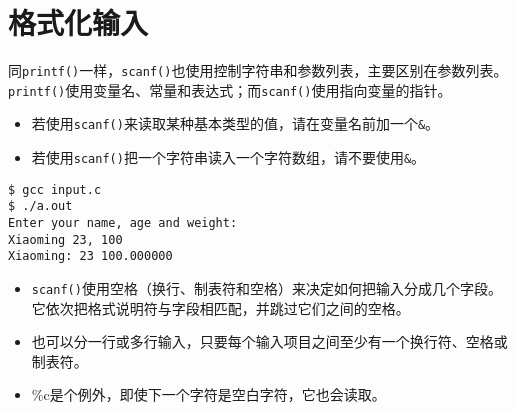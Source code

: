 \section{格式化输入}
\begin{frame}[fragile]\ft{\secname}
  同\lstinline|printf()|一样，\lstinline|scanf()|也使用控制字符串和参数列表，主要区别在参数列表。\lstinline|printf()|使用变量名、常量和表达式；而\lstinline|scanf()|使用指向变量的指针。
\end{frame}

\begin{frame}[fragile]
\begin{itemize}
\item 
  若使用\lstinline|scanf()|来读取某种基本类型的值，请在变量名前加一个\lstinline|&|。 \\[0.1in]
\item
  若使用\lstinline|scanf()|把一个字符串读入一个字符数组，请不要使用\lstinline|&|。
\end{itemize}
\end{frame}

\begin{frame}[fragile]

\end{frame}

\begin{frame}[fragile]
\begin{lstlisting}[backgroundcolor=\color{red!20}]
$ gcc input.c
$ ./a.out
Enter your name, age and weight:
Xiaoming 23, 100
Xiaoming: 23 100.000000
\end{lstlisting}
\end{frame}

\begin{frame}[fragile]
\begin{itemize}
\item
 \lstinline|scanf()|使用空格（换行、制表符和空格）来决定如何把输入分成几个字段。
它依次把格式说明符与字段相匹配，并跳过它们之间的空格。\\[0.1in]
\item
也可以分一行或多行输入，只要每个输入项目之间至少有一个换行符、空格或制表符。\\[0.1in]
\item
\%c是个例外，即使下一个字符是空白字符，它也会读取。
\end{itemize}
\end{frame}

